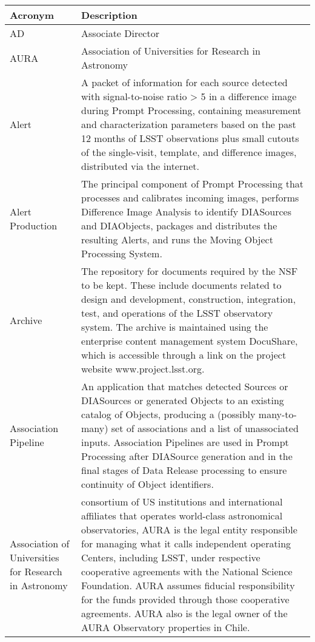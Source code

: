 \addtocounter{table}{-1}
\begin{longtable}{|l|p{}|}\hline
\textbf{Acronym} & \textbf{Description}  \\\hline

AD & Associate \gls{Director} \\\hline
AURA & \gls{Association of Universities for Research in Astronomy} \\\hline
Alert & A packet of information for each source detected with signal-to-noise ratio > 5 in a difference image during \gls{Prompt Processing}, containing measurement and characterization parameters based on the past 12 months of \gls{LSST} observations plus small cutouts of the single-visit, template, and difference images, distributed via the internet. \\\hline
Alert Production & The principal component of \gls{Prompt Processing} that processes and calibrates incoming images, performs \gls{Difference Image} Analysis to identify DIASources and DIAObjects, packages and distributes the resulting Alerts, and runs the Moving \gls{Object} Processing System. \\\hline
Archive & The repository for documents required by the \gls{NSF} to be kept. These include documents related to design and development, construction, integration, test, and operations of the \gls{LSST} observatory system. The archive is maintained using the enterprise content management system \gls{DocuShare}, which is accessible through a link on the project website www.project.lsst.org. \\\hline
Association Pipeline & An application that matches detected Sources or DIASources or generated Objects to an existing catalog of Objects, producing a (possibly many-to-many) set of associations and a list of unassociated inputs. Association Pipelines are used in \gls{Prompt Processing} after \gls{DIASource} generation and in the final stages of \gls{Data Release} processing to ensure continuity of \gls{Object} identifiers. \\\hline
Association of Universities for Research in Astronomy &  consortium of \gls{US} institutions and international affiliates that operates world-class astronomical observatories, \gls{AURA} is the legal entity responsible for managing what it calls independent operating Centers, including \gls{LSST}, under respective cooperative agreements with the \gls{National Science Foundation}. \gls{AURA} assumes fiducial responsibility for the funds provided through those cooperative agreements. \gls{AURA} also is the legal owner of the \gls{AURA} Observatory properties in Chile. \\\hline

\end{longtable}

